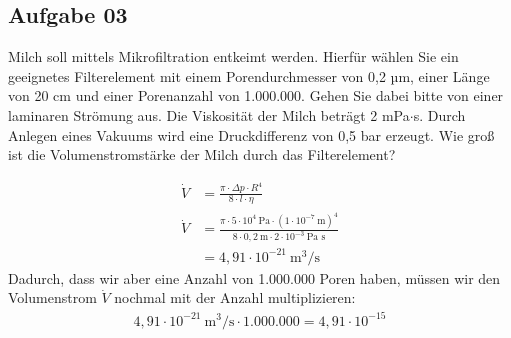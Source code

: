 \documentclass[a4paper,10pt]{article}
\begin{document}
\subsection*{Aufgabe 03}
Milch soll mittels Mikrofiltration entkeimt werden. Hierfür wählen Sie ein geeignetes
Filterelement mit einem Porendurchmesser von 0,2 µm, einer Länge von 20 cm und einer
Porenanzahl von 1.000.000. Gehen Sie dabei bitte von einer laminaren Strömung aus. Die
Viskosität der Milch beträgt 2 mPa$\cdot$s. Durch Anlegen eines Vakuums wird eine Druckdifferenz
von 0,5 bar erzeugt. Wie groß ist die Volumenstromstärke der Milch durch das Filterelement? 

\begin{align*}
\dot{V} &= \frac{\pi \cdot \Delta p \cdot R^4}{8 \cdot l \cdot \eta} \\
\dot{V} &= \frac{\pi \cdot 5 \cdot 10^4 ~\text{Pa} \cdot (1 \cdot 10^{-7} ~\text{m})^4}{8 \cdot 0,2 ~\text{m} \cdot 2 \cdot 10^{-3} ~\text{Pa s}} \\
&= 4,91 \cdot 10^{-21} ~\text{m}^3/\text{s}
\end{align*}
Dadurch, dass wir aber eine Anzahl von 1.000.000 Poren haben, müssen wir den Volumenstrom $\dot{V}$ nochmal mit der Anzahl multiplizieren:
\begin{align*}
4,91 \cdot 10^{-21} ~\text{m}^3/\text{s} \cdot 1.000.000 = 4,91 \cdot 10^{-15}
\end{align*}
\end{document}
